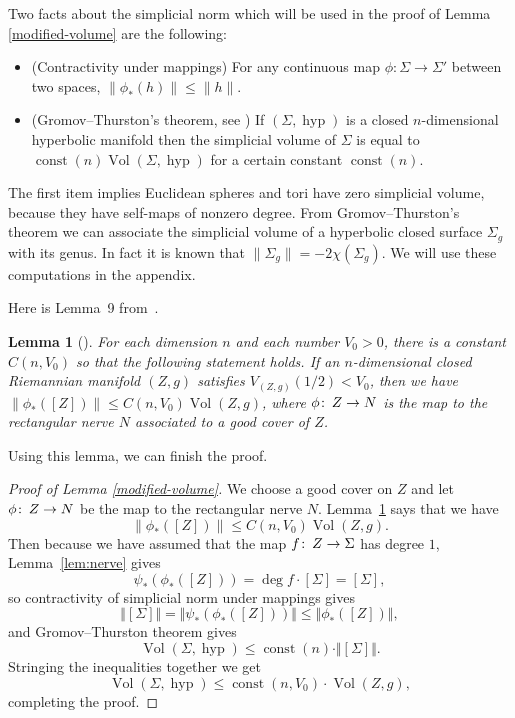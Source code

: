 \documentclass[12pt]{amsart}
\makeatletter
\newtheorem*{rep@theorem}{{Lemma} \ref##}
\newtheorem{lem}[dfn]{Lemma}
	{\newenvironment{rep{lem}}[1]{ } \begin{rep@theorem}} \end{rep@theorem}}
\numberwithin{equation}{section}
\makeatother
\begin{document}
Two facts about the simplicial norm which will be used in the proof of
Lemma \ref{modified-volume} are the following:
\begin{itemize}
 \item(Contractivity under mappings) For any continuous map $\phi:\Sigma\to \Sigma'$
      between two spaces, $\|\phi_{\ast}(h)\|\leq \|h\|$.
 \item(Gromov--Thurston's theorem, see \cite{Gromov82}) If $(\Sigma,\operatorname{hyp})$ is a closed $n$-dimensional
      hyperbolic manifold then the simplicial volume of $\Sigma$ is
      equal to $\operatorname{const}(n) \operatorname{Vol}(\Sigma,\operatorname{hyp})$ for a certain constant $\operatorname{const}(n)$.
 \end{itemize}The first item implies Euclidean spheres and tori have
      zero simplicial volume, because they have self-maps of nonzero degree. From Gromov--Thurston's theorem we can associate the simplicial volume of
a hyperbolic closed surface $\Sigma_g$ with its genus. In fact it is
known that $\| \Sigma_g \|=-2\chi(\Sigma_g)$. We will use these
computations in the appendix.

Here is Lemma~9 from~\cite{Guth11}.

 \begin{lem}[{\cite[Lemma 9]{Guth11}}]\label{lem:lem9 in larry}For each dimension $n$ and each number $V_0>0$, there is a
  constant $C(n,V_0)$ so that the following statement holds. If an
  $n$-dimensional closed Riemannian manifold $(Z,g)$ satisfies $V_{(Z,g)}(1/2)<V_0$, then we have $\|\phi_{\ast}([Z]) \|\leq C(n,V_0)\operatorname{Vol}(Z,g)$, where $\phi {\colon\thinspace} Z \rightarrow N$ is the map to the rectangular nerve $N$ associated to a good cover of $Z$. 
  \end{lem}

Using this lemma, we can finish the proof.

\begin{proof}[Proof of Lemma \ref{modified-volume}]
We choose a good cover on $Z$ and let $\phi {\colon\thinspace} Z \rightarrow N$ be the map to the rectangular nerve $N$.  Lemma~\ref{lem:lem9 in larry} says that we have
\[\|\phi_{\ast}([Z]) \|\leq C(n,V_0)\operatorname{Vol}(Z,g).\]
Then because we have assumed that the map $f {\colon\thinspace} Z \rightarrow \Sigma$ has degree $1$, Lemma~\ref{lem:nerve} gives
\[\psi_*(\phi_*([Z])) =  \deg f \cdot [\Sigma] = [\Sigma],\]
so contractivity of simplicial norm under mappings gives
\[\Vert [\Sigma] \Vert = \Vert \psi_*(\phi_*([Z])) \Vert \leq \Vert \phi_*([Z]) \Vert,\]
and Gromov--Thurston theorem gives
\[\operatorname{Vol}(\Sigma, \operatorname{hyp}) \leq \operatorname{const}(n) \cdot \Vert [\Sigma] \Vert.\]
Stringing the inequalities together we get
\[\operatorname{Vol}(\Sigma, \operatorname{hyp}) \leq \operatorname{const}(n, V_0) \cdot \operatorname{Vol}(Z, g),\]
completing the proof.
\end{proof}
\end{document}
